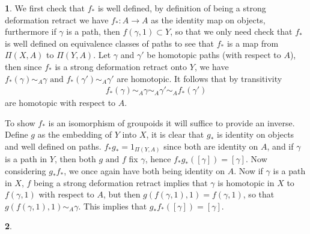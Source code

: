 \documentclass[10.5pt]{article}
\theoremstyle{definition}
\newtheorem{pb}{}
\newcommand{\tand}{\text{ and }}
\begin{document}
    \begin{pb}
        We first check that \(f_*\) is well defined, by definition of being a strong deformation retract we have \(f_*: A \to A\) as the identity map on objects, furthermore if \(\gamma\) is a path, then
        \(f(\gamma,1)\subset Y\), so that we only need check that \(f_*\) is well defined on equivalence classes of paths to see that \(f_*\) is a map from \(\Pi(X,A)\) to \(\Pi(Y,A)\).
        Let \(\gamma\) and \(\gamma'\) be homotopic paths (with respect to \(A\)), then since \(f_*\) is a strong deformation retract onto \(Y\), we have
        \(f_*(\gamma) \sim_A \gamma \tand f_*(\gamma') \sim_A \gamma'\) are homotopic. It follows that by transitivity
        \begin{align*}
            f_*(\gamma) \sim_A \gamma \sim_A \gamma' \sim_A f_*(\gamma')
        \end{align*}
        are homotopic with respect to \(A\).

        To show \(f_*\) is an isomorphism of groupoids it will suffice to provide an inverse. Define \(g\) as the embedding of \(Y\) into \(X\), it is clear that \(g_*\) is identity on objects and
        well defined on paths. \(f_*g_* = 1_{\Pi(Y,A)}\) since both are identity on \(A\), and if \(\gamma\) is a path in \(Y\), then both \(g \tand f\) fix \(\gamma\), hence
        \(f_*g_*([\gamma]) = [\gamma]\). Now considering \(g_*f_*\), we once again have both being identity on \(A\). Now if \(\gamma\) is a path in \(X\), \(f\) being a strong
        deformation retract implies that \(\gamma\) is homotopic in \(X\) to \(f(\gamma,1)\) with respect to \(A\), but then \(g(f(\gamma,1),1) = f(\gamma,1)\), so that
        \(g(f(\gamma,1),1) \sim_A \gamma\). This implies that \(g_*f_*([\gamma]) = [\gamma]\).
    \end{pb}
    \begin{pb}
    \end{pb}
\end{document}
